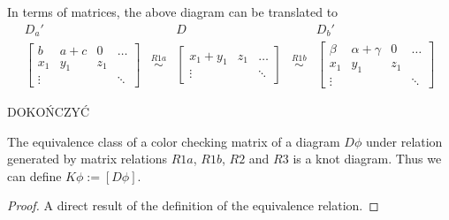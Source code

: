 In terms of matrices, the above diagram can be translated to
$$
\begin{matrix}
  D_a' & & D & & D_b'\\ 
  \begin{bmatrix}
    b & a+c  & 0 & \hdots\\ 
    x_1 & y_1 & z_1 \\ 
    \vdots & & & \ddots
  \end{bmatrix} 
       & \overset{R1a}{\sim} &
     \begin{bmatrix}
       x_1 + y_1 & z_1 & \hdots\\ 
       \vdots & & \ddots
     \end{bmatrix} 
       & \overset{R1b}{\sim} &
  \begin{bmatrix}
    \beta & \alpha+\gamma  & 0 & \hdots\\ 
    x_1 & y_1 & z_1 \\ 
    \vdots & & & \ddots
  \end{bmatrix} 
\end{matrix}
$$

{\large\color{purple}DOKOŃCZYĆ}

\begin{theorem}
  The equivalence class of a color checking matrix of a diagram $D\phi$ under relation generated by matrix relations $R1a$, $R1b$, $R2$ and $R3$ is a knot diagram. Thus we can define $K\phi:=[D\phi]$.
\end{theorem}

\begin{proof}
  A direct result of the definition of the equivalence relation.
\end{proof}
